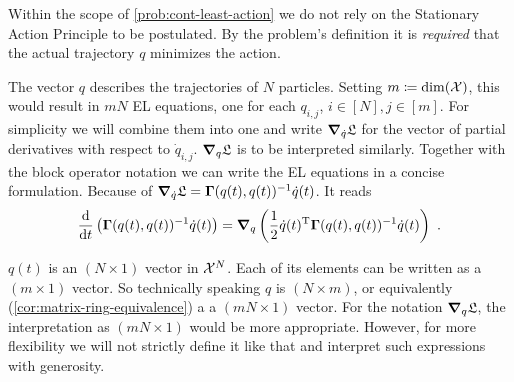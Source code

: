 Within the scope of \cref{prob:cont-least-action} we do not rely on the Stationary Action Principle to be postulated.
By the problem's definition it is \emph{required} that the actual trajectory $q$ minimizes the action.

The vector $q$ describes the trajectories of $N$ particles.
Setting $m \coloneqq \mathrm{dim}(\mathcal{X})$, this would result in $mN$ EL equations, one for each $q_{i, j}$, $i \in [N], j \in [m]$.
For simplicity we will combine them into one and write $\grad_{\dot{q}} \mathfrak{L}$ for the vector of partial derivatives with respect to $\dot{q}_{i, j}$.
$\grad_q \mathfrak{L}$ is to be interpreted similarly.
Together with the block operator notation we can write the EL equations in a concise formulation.
Because of $\grad_{\dot{q}} \mathfrak{L} = \mathbf{\Gamma}(q(t), q(t))^{-1} \dot{q}(t)$. It reads
\begin{equation}
\label{eq:concrete-lagrangian}
	\frac{\mathrm{d}}{\mathrm{d}t} \left(\mathbf{\Gamma}(q(t), q(t))^{-1} \dot{q}(t) \right)
	= \grad_q \left(\frac{1}{2} \dot{q}(t)^\mathrm{T} \mathbf{\Gamma}(q(t), q(t))^{-1} \dot{q}(t)\right) \ .
\end{equation}

$q(t)$ is an $(N\times1)$ vector in $\mathcal{X}^N$.
Each of its elements can be written as a $(m\times1)$ vector.
So technically speaking $q$ is $(N \times m)$, or equivalently (\cref{cor:matrix-ring-equivalence}) a a $(mN \times 1)$ vector.
For the notation $\grad_q \mathfrak{L}$, the interpretation as $(mN \times 1)$ would be more appropriate.
However, for more flexibility we will not strictly define it like that and interpret such expressions with generosity.
